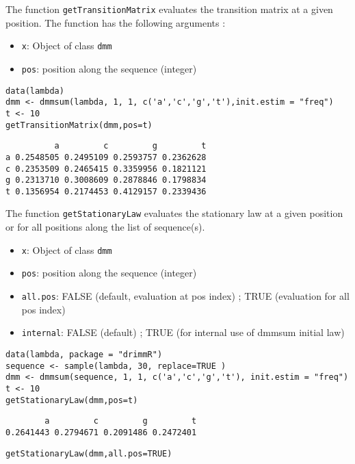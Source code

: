 \documentclass[article,nojss]{jss}\usepackage[]{graphicx}\usepackage[]{color}
\begin{document}
The function {\tt getTransitionMatrix} evaluates the transition matrix at a given position. The function has the following arguments :

%
\begin{itemize}
\item {\tt x}: Object of class {\tt dmm}
\item {\tt pos}:  position along the sequence (integer)
\end{itemize}
%

\begin{lstlisting}
data(lambda)
dmm <- dmmsum(lambda, 1, 1, c('a','c','g','t'),init.estim = "freq")
t <- 10
getTransitionMatrix(dmm,pos=t)
\end{lstlisting}


\begin{lstlisting}
          a         c         g         t
a 0.2548505 0.2495109 0.2593757 0.2362628
c 0.2353509 0.2465415 0.3359956 0.1821121
g 0.2313710 0.3008609 0.2878846 0.1798834
t 0.1356954 0.2174453 0.4129157 0.2339436
\end{lstlisting}

\clearpage

The function {\tt getStationaryLaw} evaluates the stationary law at a given position or for all positions along the list of sequence(s).

%
\begin{itemize}
\item {\tt x}: Object of class {\tt dmm}
\item {\tt pos}:  position along the sequence (integer)
\item {\tt all.pos}: FALSE (default, evaluation at pos index) ; TRUE (evaluation for all pos index)
\item {\tt internal}: FALSE (default) ; TRUE (for internal use of dmmsum initial law)
\end{itemize}
%


\begin{lstlisting}
data(lambda, package = "drimmR")
sequence <- sample(lambda, 30, replace=TRUE )
dmm <- dmmsum(sequence, 1, 1, c('a','c','g','t'), init.estim = "freq")
t <- 10
getStationaryLaw(dmm,pos=t)
\end{lstlisting}

\begin{lstlisting}
        a         c         g         t
0.2641443 0.2794671 0.2091486 0.2472401
\end{lstlisting}

\begin{lstlisting}
getStationaryLaw(dmm,all.pos=TRUE)
\end{lstlisting}
\end{document}
